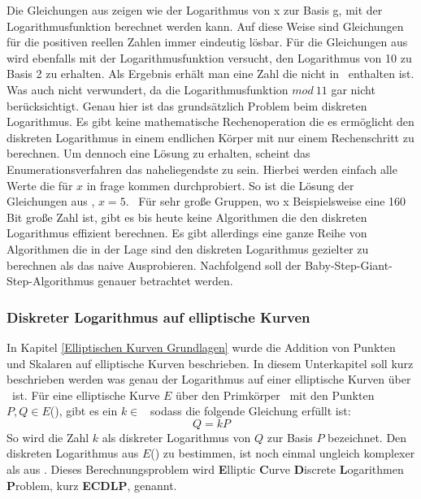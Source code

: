 		Die Gleichungen aus  zeigen wie der Logarithmus von x zur Basis g, mit der Logarithmusfunktion berechnet werden kann. Auf diese Weise sind Gleichungen für die positiven reellen Zahlen  immer eindeutig lösbar. Für die Gleichungen aus  wird ebenfalls mit der Logarithmusfunktion versucht, den Logarithmus von 10 zu Basis 2 zu erhalten. Als Ergebnis erhält man eine Zahl die nicht in \myZPStern~enthalten ist. Was auch nicht verwundert, da die Logarithmusfunktion $mod~11$ gar nicht berücksichtigt. Genau hier ist das grundsätzlich Problem beim diskreten Logarithmus. Es gibt keine mathematische Rechenoperation die es ermöglicht den diskreten Logarithmus in einem endlichen Körper mit nur einem Rechenschritt zu berechnen. Um dennoch eine Lösung zu erhalten, scheint das Enumerationsverfahren das naheliegendste zu sein. Hierbei werden einfach alle Werte die für $x$ in frage kommen durchprobiert. So ist die Lösung der Gleichungen aus , $x = 5$.~\cite{DLP:ECDLP:Probleme:und:Loesungen} Für sehr große Gruppen, wo x Beispielsweise eine 160 Bit große Zahl ist, gibt es bis heute keine Algorithmen die den diskreten Logarithmus effizient berechnen.\cite{Kryptografie:in:Theorie:und:Praxis} Es gibt allerdings eine ganze Reihe von Algorithmen die in der Lage sind den diskreten Logarithmus gezielter zu berechnen als das naive Ausprobieren. Nachfolgend soll der Baby-Step-Giant-Step-Algorithmus genauer betrachtet werden.
		
		
		\subsubsection{Diskreter Logarithmus auf elliptische Kurven}
		In Kapitel \ref{Elliptischen Kurven Grundlagen} wurde die Addition von Punkten und Skalaren auf elliptische Kurven beschrieben. In diesem Unterkapitel soll kurz beschrieben werden was genau der Logarithmus auf einer elliptische Kurven über \myZPStern~ist. Für eine elliptische Kurve $E$ über den Primkörper \myZPStern~mit den Punkten $P, Q \in E$(\myZPStern), gibt es ein $k \in$ \myZPStern~sodass die folgende Gleichung erfüllt ist:
		\begin{displaymath}
		Q = kP
		\end{displaymath}
		So wird die Zahl $k$ als diskreter Logarithmus von $Q$ zur Basis $P$ bezeichnet. Den diskreten Logarithmus aus $E$(\myZPStern) zu bestimmen, ist noch einmal ungleich komplexer als aus \myZPStern. Dieses Berechnungsproblem wird \textbf{E}lliptic \textbf{C}urve \textbf{D}iscrete \textbf{L}ogarithmen \textbf{P}roblem, kurz \textbf{ECDLP}, genannt.

